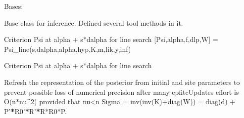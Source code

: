 \documentclass[letterpaper,10pt,english]{sphinxmanual}
\begin{document}
\begin{fulllineitems}
\label{pyGPs.Core:pyGPs.Core.inf.Inference}
Bases: 

Base class for inference. Defined several tool methods in it.

\begin{fulllineitems}
\label{pyGPs.Core:pyGPs.Core.inf.Inference.Psi_line}
Criterion Psi at alpha + s*dalpha for line search
{[}Psi,alpha,f,dlp,W{]} = Psi\_line(s,dalpha,alpha,hyp,K,m,lik,y,inf)

\end{fulllineitems}


\begin{fulllineitems}
\label{pyGPs.Core:pyGPs.Core.inf.Inference.Psi_lineFITC}
Criterion Psi at alpha + s*dalpha for line search

\end{fulllineitems}


\begin{fulllineitems}
\label{pyGPs.Core:pyGPs.Core.inf.Inference.epComputeParams}
\end{fulllineitems}


\begin{fulllineitems}
\label{pyGPs.Core:pyGPs.Core.inf.Inference.epfitcRefresh}
Refresh the representation of the posterior from initial and site parameters
to prevent possible loss of numerical precision after many epfitcUpdates
effort is O(n*nu\textasciicircum{}2) provided that nu\textless{}n
Sigma = inv(inv(K)+diag(W)) = diag(d) + P'{\color{red}\bfseries{}*}R0'{\color{red}\bfseries{}*}R'{\color{red}\bfseries{}*}R*R0*P.


\end{fulllineitems}
\end{fulllineitems}
\end{document}

